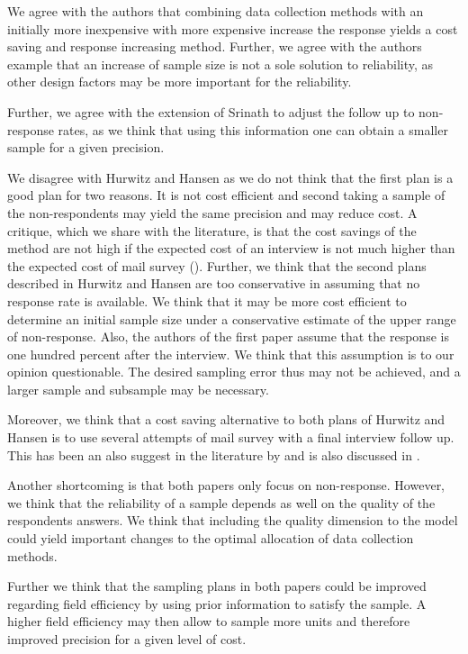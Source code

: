 \par
We agree with the authors that combining data collection methods with an initially more inexpensive with more expensive increase the response yields a cost saving and response increasing method.  Further, we agree with the authors example that an increase of sample size is not a sole solution to reliability, as other design factors may be more important for the reliability.  \par 
Further, we agree with the extension of Srinath to adjust the follow up to non-response rates, as we think that using this information one can obtain a smaller sample for a given precision.  \par
We disagree with Hurwitz and Hansen as we do not think that the first plan is a good plan for two reasons. It is not cost efficient and second taking a sample of the non-respondents may yield the same precision and may reduce cost. 
A critique, which we share with the literature,  is that the cost savings of the method are not high if the expected cost of an interview is not much higher than the expected cost of mail survey  (\cite{durbin1953}). 
Further, we think that the second plans described in Hurwitz and Hansen are too conservative in assuming that no response rate is available. We think that it may be more cost efficient to determine an initial sample size under a conservative estimate of the upper range of non-response. 
Also, the authors of the first paper assume that the response is one hundred percent after the interview. We think that this assumption is to our opinion questionable. 
The desired sampling error thus may not be achieved, and a larger sample and subsample may be necessary.\par
Moreover, we think that a cost saving alternative to both plans of Hurwitz and Hansen is to use several attempts of mail survey with a final interview follow up. This has been an also suggest in the literature by  \cite{el1956} and is also discussed in \cite{Srinath}. 
\par
Another shortcoming is that both papers only focus on non-response. 
However, we think that the reliability of a sample depends as well on the quality of the respondents answers. 
We think that including the quality dimension to the model could yield important changes to the optimal allocation of data collection methods. 
  \par Further we think that the sampling plans in both papers could be improved regarding field efficiency by using prior information to satisfy the sample. A higher field efficiency may then allow to sample more units and therefore improved precision for a given level of cost. 
\endinput
